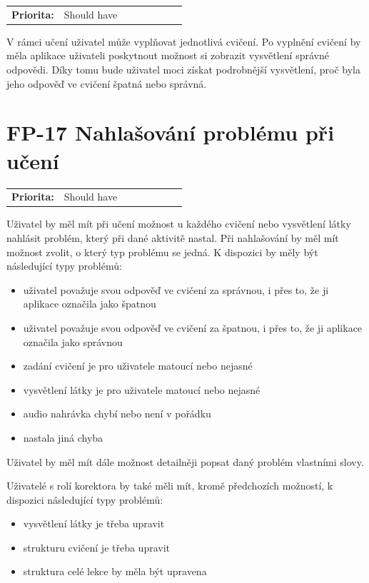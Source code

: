 \begin{tabular}{lp{0.7\linewidth}}
    \textbf{Priorita:} & Should have \\
\end{tabular}

V rámci učení uživatel může vyplňovat jednotlivá cvičení. Po vyplnění cvičení by měla aplikace uživateli poskytnout možnost si zobrazit vysvětlení správné odpovědi. Díky tomu bude uživatel moci získat podrobnější vysvětlení, proč byla jeho odpověď ve cvičení špatná nebo správná.

\section{FP-17 Nahlašování problému při učení}\label{sec:fp-report-learning-issue}

\begin{tabular}{lp{0.7\linewidth}}
    \textbf{Priorita:} & Should have \\
\end{tabular}

Uživatel by měl mít při učení možnost u každého cvičení nebo vysvětlení látky nahlásit problém, který při dané aktivitě nastal. Při nahlašování by měl mít možnost zvolit, o který typ problému se jedná. K dispozici by měly být následující typy problémů:

\begin{itemize}
    \item uživatel považuje svou odpověď ve cvičení za správnou, i přes to, že ji aplikace označila jako špatnou
    \item uživatel považuje svou odpověď ve cvičení za špatnou, i přes to, že ji aplikace označila jako správnou
    \item zadání cvičení je pro uživatele matoucí nebo nejasné
    \item vysvětlení látky je pro uživatele matoucí nebo nejasné
    \item audio nahrávka chybí nebo není v pořádku
    \item nastala jiná chyba
\end{itemize}

Uživatel by měl mít dále možnost detailněji popsat daný problém vlastními slovy.

Uživatelé s rolí korektora by také měli mít, kromě předchozích možností, k dispozici následující typy problémů:

\begin{itemize}
    \item vysvětlení látky je třeba upravit
    \item strukturu cvičení je třeba upravit
    \item struktura celé lekce by měla být upravena
\end{itemize}

